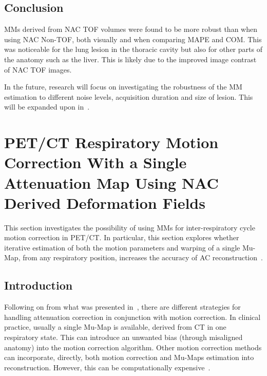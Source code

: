         \subsection{Conclusion} \label{sec:impact_of_tof_on_respiratory_motion_model_estimation_using_pre_gated_no_intra_cycle_motion_nac_pet_conclusion}
            \glspl{MM} derived from \gls{NAC} \gls{TOF} volumes were found to be more robust than when using \gls{NAC} \gls{Non-TOF}, both visually and when comparing \gls{MAPE} and \gls{COM}. This was noticeable for the lung lesion in the thoracic cavity but also for other parts of the anatomy such as the liver. This is likely due to the improved image contrast of \gls{NAC} \gls{TOF} images.

            In the future, research will focus on investigating the robustness of the \gls{MM} estimation to different noise levels, acquisition duration and size of lesion. This will be expanded upon in~.
    
    \section{PET/CT Respiratory Motion Correction With a Single Attenuation Map Using NAC Derived Deformation Fields} \label{sec:pet_ct_respiratory_motion_correction_with_a_single_attenuation_map_using_nac_derived_deformation_fields}
        This section investigates the possibility of using \glspl{MM} for inter-respiratory cycle motion correction in \gls{PET}/\gls{CT}. In particular, this section explores whether iterative estimation of both the motion parameters and warping of a single \gls{Mu-Map}, from any respiratory position, increases the accuracy of \gls{AC} reconstruction~\parencite{Whitehead2020PET/CTFields}.
        
        \subsection{Introduction} \label{sec:pet_ct_respiratory_motion_correction_with_a_single_attenuation_map_using_nac_derived_deformation_fields_introduction}
            Following on from what was presented in~, there are different strategies for handling attenuation correction in conjunction with motion correction. In clinical practice, usually a single \gls{Mu-Map} is available, derived from \gls{CT} in one respiratory state. This can introduce an unwanted bias (through misaligned anatomy) into the motion correction algorithm. Other motion correction methods can incorporate, directly, both motion correction and \glspl{Mu-Map} estimation into reconstruction. However, this can be computationally expensive~\parencite{Bousse2016a, Bousse2016}.
            
